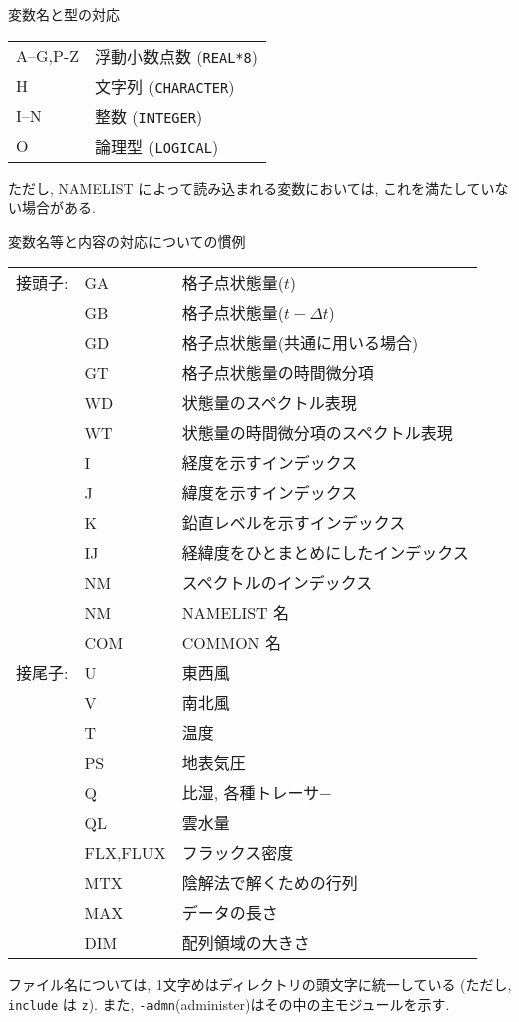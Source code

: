 \・変数名と型の対応 
\begin{center}
\begin{tabular}{ll}
 A--G,P-Z    & 浮動小数点数 ({\tt REAL*8}) \\
 H           & 文字列 ({\tt CHARACTER}) \\
 I--N        & 整数   ({\tt INTEGER}) \\
 O           & 論理型 ({\tt LOGICAL})
\end{tabular}
\end{center}
ただし, NAMELIST によって読み込まれる変数においては, 
これを満たしていない場合がある.

\pagebreak
\・変数名等と内容の対応についての慣例 
\begin{center} 
\begin{tabular}{lll}
  接頭子: &  GA      & 格子点状態量($t$)         \\
          &  GB      & 格子点状態量($t-\Delta t$) \\
          &  GD      & 格子点状態量(共通に用いる場合) \\   
          &  GT      & 格子点状態量の時間微分項 \\
          &  WD      & 状態量のスペクトル表現 \\
          &  WT      & 状態量の時間微分項のスペクトル表現 \\
          &  I       & 経度を示すインデックス \\
          &  J       & 緯度を示すインデックス \\
          &  K       & 鉛直レベルを示すインデックス \\
          &  IJ      & 経緯度をひとまとめにしたインデックス \\
          &  NM      & スペクトルのインデックス \\
          &  NM      & NAMELIST 名 \\
          &  COM     & COMMON 名 \\
  接尾子: &  U       & 東西風 \\
          &  V       & 南北風 \\
          &  T       & 温度 \\
          &  PS      & 地表気圧 \\
          &  Q       & 比湿, 各種トレーサ− \\
          &  QL      & 雲水量 \\
          & FLX,FLUX & フラックス密度 \\
          & MTX      & 陰解法で解くための行列 \\
          & MAX      & データの長さ \\
          & DIM      & 配列領域の大きさ \\
\end{tabular}
\end{center}

\・ファイル名については, 
  1文字めはディレクトリの頭文字に統一している
  (ただし, {\tt include} は {\tt z}).
  また, {\tt -admn\/}(administer)はその中の主モジュールを示す.

